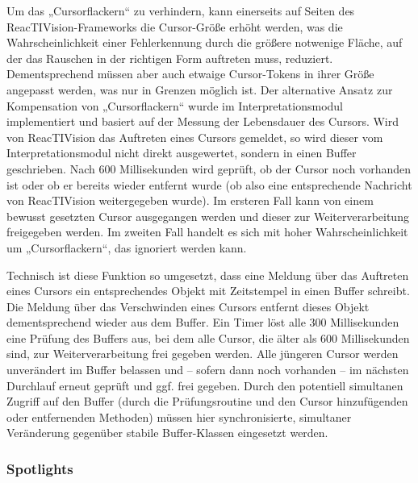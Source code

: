 Um das „Cursorflackern“ zu verhindern, kann einerseits auf Seiten des ReacTIVision-Frameworks die Cursor-Größe erhöht werden, was die Wahrscheinlichkeit einer Fehlerkennung durch die größere notwenige Fläche, auf der das Rauschen in der richtigen Form auftreten muss, reduziert. Dementsprechend müssen aber auch etwaige Cursor-Tokens in ihrer Größe angepasst werden, was nur in Grenzen möglich ist. Der alternative Ansatz zur Kompensation von „Cursorflackern“ wurde im Interpretationsmodul implementiert und basiert auf der Messung der Lebensdauer des Cursors. Wird von ReacTIVision das Auftreten eines Cursors gemeldet, so wird dieser vom Interpretationsmodul nicht direkt ausgewertet, sondern in einen Buffer geschrieben. Nach 600 Millisekunden wird geprüft, ob der Cursor noch vorhanden ist oder ob er bereits wieder entfernt wurde (ob also eine entsprechende Nachricht von ReacTIVision weitergegeben wurde). Im ersteren Fall kann von einem bewusst gesetzten Cursor ausgegangen werden und dieser zur Weiterverarbeitung freigegeben werden. Im zweiten Fall handelt es sich mit hoher Wahrscheinlichkeit um „Cursorflackern“, das ignoriert werden kann. 

Technisch ist diese Funktion so umgesetzt, dass eine Meldung über das Auftreten eines Cursors ein entsprechendes Objekt mit Zeitstempel in einen Buffer schreibt. Die Meldung über das Verschwinden eines Cursors entfernt dieses Objekt dementsprechend wieder aus dem Buffer. Ein Timer löst alle 300 Millisekunden eine Prüfung des Buffers aus, bei dem alle Cursor, die älter als 600 Millisekunden sind, zur Weiterverarbeitung frei gegeben werden. Alle jüngeren Cursor werden unverändert im Buffer belassen und -- sofern dann noch vorhanden -- im nächsten Durchlauf erneut geprüft und ggf. frei gegeben. Durch den potentiell simultanen Zugriff auf den Buffer (durch die Prüfungsroutine und den Cursor hinzufügenden oder entfernenden Methoden) müssen hier synchronisierte, simultaner Veränderung gegenüber stabile Buffer-Klassen eingesetzt werden.


\subsubsection{Spotlights} %
\label{ssub:spotlights}


